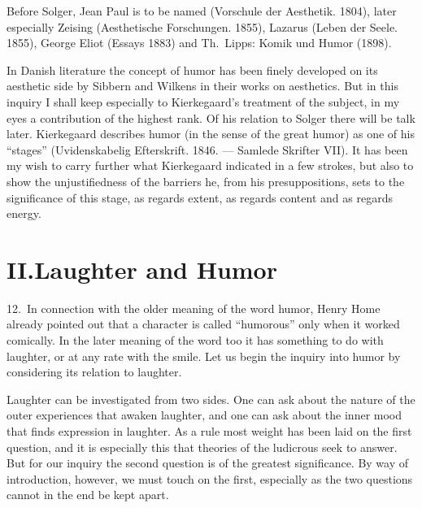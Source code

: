 \documentclass[12pt]{book}
\newcommand{\opage}[1]{\marginnote{\footnotesize\textit{[#1]}}}
\begin{document}
Before Solger, Jean Paul is to be named (Vorschule der Aesthetik. 1804), later
especially Zeising (Aesthetische Forschungen. 1855), Lazarus (Leben der Seele.
1855), George Eliot (Essays 1883) and Th.~Lipps: Komik und Humor (1898).

In Danish literature the concept of humor has been finely developed on its
aesthetic side by Sibbern and Wilkens in their works on aesthetics. But in this
inquiry I shall keep especially to Kierkegaard's treatment of the subject, in my
eyes a contribution of the highest rank. Of his relation to Solger there will be
talk later. Kierkegaard describes humor (in the sense of the great humor) as one of
his ``stages'' (Uvidenskabelig Efterskrift. 1846. --- Samlede Skrifter
VII). It has been my wish to carry further what Kierkegaard indicated in a few
strokes, but also to show the unjustifiedness of the barriers he, from his
presuppositions, sets to the significance of this stage, as regards extent, as
regards content and as regards energy.

\chapter*{II.\quad Laughter and Humor}
\opage{48}12.~In connection with the older meaning of the word humor, Henry Home
already pointed out that a character is called ``humorous'' only when it worked
comically. In the later meaning of the word too it has something to do with
laughter, or at any rate with the smile. Let us begin the inquiry into humor by
considering its relation to laughter.

Laughter can be investigated from two sides. One can ask about the nature of the
outer experiences that awaken laughter, and one can ask about the inner mood that
finds expression in laughter. As a rule most weight has been laid on the first
question, and it is especially this that theories of the ludicrous seek to answer.
But for our inquiry the second question is of the greatest significance. By way of
introduction, however, we must touch on the first, especially as the two questions
cannot in the end be kept apart.
\end{document}

